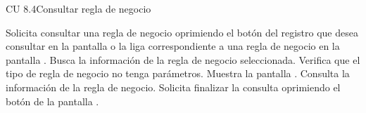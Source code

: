 \begin{UseCase}{CU 8.4}{Consultar regla de negocio}

	


\end{UseCase}
 \begin{UCtrayectoria}
    \UCpaso[\UCactor] Solicita consultar una regla de negocio oprimiendo el botón \btnConsulta del registro que desea consultar en la pantalla  o la liga correspondiente a una regla de negocio en la pantalla .
    \UCpaso[\UCsist] Busca la información de la regla de negocio seleccionada.  %
    \UCpaso[\UCsist] Verifica que el tipo de regla de negocio no tenga parámetros.   
    \UCpaso[\UCsist] Muestra la pantalla .
    \UCpaso[\UCactor] Consulta la información de la regla de negocio. \label{cu8.4:consultarElemento} 
    \UCpaso[\UCactor] Solicita finalizar la consulta oprimiendo el botón  de la pantalla . \label{cu8.4:finalizar}
 \end{UCtrayectoria}
 
